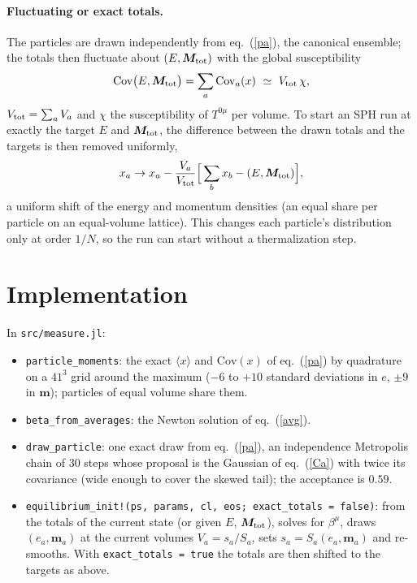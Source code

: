 \documentclass[11pt,aps,preprint,nofootinbib,superscriptaddress,tightenlines]{revtex4-2}
\def\st{\begin{equation}}
\def\stp{\end{equation}}
\def\Eq#1{eq.~(\ref{#1})}
\newcommand{\avg}[1]{\langle #1\rangle}
\let\oldparagraph\paragraph
\renewcommand{\paragraph}{\par\bigskip\oldparagraph}
\begin{document}
\paragraph{Fluctuating or exact totals.}  The particles are drawn independently from
\Eq{pa}, the canonical ensemble; the totals then fluctuate about $(E,\bm M_{\rm tot})$
with the global susceptibility
\st
\mathrm{Cov}\big(E,\bm M_{\rm tot}\big)=\sum_a\mathrm{Cov}_a(x)\ \simeq\ V_{\rm tot}\,\chi ,
\label{global}
\stp
$V_{\rm tot}=\sum_aV_a$ and $\chi$ the susceptibility of $T^{0\mu}$ per volume.  To start an
SPH run at exactly the target $E$ and $\bm M_{\rm tot}$, the difference between the drawn
totals and the targets is then removed uniformly,
\st
x_a\to x_a-\frac{V_a}{V_{\rm tot}}\Big[\sum_bx_b-(E,\bm M_{\rm tot})\Big],
\stp
a uniform shift of the energy and momentum densities (an equal share per particle on an
equal-volume lattice).  This changes each particle's distribution only at order $1/N$,
so the run can start without a thermalization step.

\section{Implementation}
\label{sec:impl}

In \texttt{src/measure.jl}:
\begin{itemize}
\item \texttt{particle\_moments}: the exact $\avg{x}$ and $\mathrm{Cov}(x)$ of \Eq{pa} by
  quadrature on a $41^3$ grid around the maximum ($-6$ to $+10$ standard deviations in
  $e$, $\pm9$ in $\bm m$); particles of equal volume share them.
\item \texttt{beta\_from\_averages}: the Newton solution of \Eq{avg}.
\item \texttt{draw\_particle}: one exact draw from \Eq{pa}, an independence Metropolis
  chain of 30 steps whose proposal is the Gaussian of \Eq{Ca} with twice its covariance
  (wide enough to cover the skewed tail); the acceptance is $0.59$.
\item \texttt{equilibrium\_init!(ps, params, cl, eos; exact\_totals = false)}: from the
  totals of the current state (or given $E$, $\bm M_{\rm tot}$), solves for $\beta^\mu$,
  draws $(e_a,\bm m_a)$ at the current volumes $V_a=s_a/S_a$, sets $s_a=S_a(e_a,\bm m_a)$
  and re-smooths.  With \texttt{exact\_totals = true} the totals are then shifted to
  the targets as above.
\end{itemize}
\end{document}
